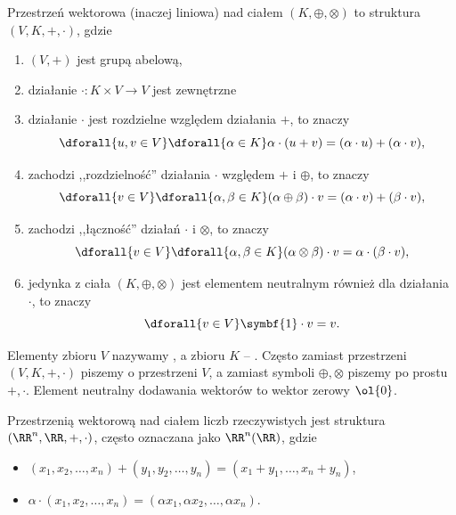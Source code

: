 \begin{definition}
    \label{d:vector_space}
    Przestrzeń wektorowa (inaczej liniowa) nad ciałem $(K, \oplus, \otimes)$ to struktura $(V, K, +, \cdot)$, gdzie
    \begin{enumerate}
        \item $(V, +)$ jest grupą abelową,
        \item działanie $\cdot : K \times V \to V$ jest zewnętrzne
        \item działanie $\cdot$ jest rozdzielne względem działania $+$, to znaczy
            \[ \dforall{u, v \in V} \dforall{\alpha \in K} \alpha\cdot(u + v) = (\alpha \cdot u) + (\alpha \cdot v), \]
        \item zachodzi ,,rozdzielność'' działania $\cdot$ względem $+$ i $\oplus$, to znaczy
            \[ \dforall{v \in V} \dforall{\alpha, \beta \in K} (\alpha \oplus \beta) \cdot v = (\alpha \cdot v) + (\beta \cdot v), \]
        \item zachodzi ,,łączność'' działań $\cdot$ i $\otimes$, to znaczy
            \[ \dforall{v \in V} \dforall{\alpha, \beta \in K} (\alpha \otimes \beta) \cdot v = \alpha \cdot (\beta \cdot v), \]
        \item jedynka z ciała $(K, \oplus, \otimes)$ jest elementem neutralnym również dla działania $\cdot$, to znaczy
            \[ \dforall{v \in V} \symbf{1} \cdot v = v. \]
    \end{enumerate}
\end{definition}

Elementy zbioru $V$ nazywamy , a zbioru $K$ -- . Często zamiast przestrzeni $(V, K, +, \cdot)$ piszemy o przestrzeni $V$, a zamiast symboli $\oplus, \otimes$ piszemy po prostu $+, \cdot$. Element neutralny dodawania wektorów to wektor zerowy $\ol{0}$.

\begin{example}
    Przestrzenią wektorową nad ciałem liczb rzeczywistych jest struktura $(\RR^n, \RR, +, \cdot)$, często oznaczana jako $\RR^n(\RR)$, gdzie
    \begin{itemize}[noitemsep,nolistsep]
        \item $(x_1, x_2, \ldots, x_n) + (y_1, y_2, \ldots, y_n) = (x_1 + y_1, \ldots, x_n + y_n)$,
        \item $\alpha \cdot (x_1, x_2, \ldots, x_n) = (\alpha x_1, \alpha x_2, \ldots, \alpha x_n)$.
    \end{itemize}
\end{example}

